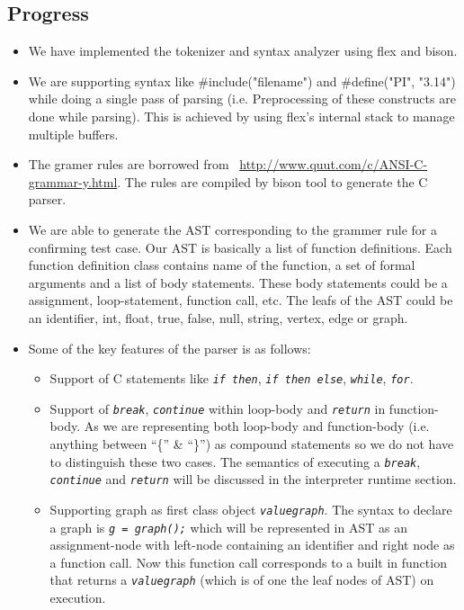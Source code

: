 \documentclass[12,twoside]{article}
\begin{document}
  \subsection{Progress}
  \begin{itemize}
    \item We have implemented the tokenizer and syntax analyzer using flex and 
    bison.  
    \item We are supporting syntax like \#include("filename") and 
    \#define("PI", "3.14") while doing a single pass of parsing  (i.e. 
        Preprocessing of these constructs are done while parsing). This is 
    achieved by using flex's internal stack to manage multiple buffers.

    \item The gramer rules are borrowed from 
    ~\url{http://www.quut.com/c/ANSI-C-grammar-y.html}. The rules are compiled 
    by bison tool to generate the C parser. 

    \item  We are able to generate the AST corresponding to the grammer rule for 
    a confirming test case. Our AST is basically a list of 
    function definitions. Each function definition class contains name of the 
    function, a set of formal arguments and a list of body statements. These 
    body statements could be a assignment, loop-statement, function call, etc.
    The leafs of the AST could be an identifier, int, float, true, false, null, 
    string, vertex, edge or graph.

    \item Some of the key features of the parser is as follows:
    \begin{itemize}
      \item Support of C statements like  {\tt\emph{if then}}, {\tt\emph{if then 
        else}}, {\tt\emph{while}}, {\tt\emph{for}}. 

      \item Support of {\tt\emph{break}}, {\tt\emph{continue}} within loop-body 
      and {\tt\emph{return}} in function-body.
      As we are representing both loop-body and function-body (i.e. anything 
          between ``\{'' \& ``\}'') as compound statements so we do not have to
      distinguish these two cases. The semantics of executing a 
{\tt\emph{break}}, {\tt\emph{continue}} and {\tt\emph{return}} will be discussed 
in the interpreter runtime section.

      \item Supporting graph as first class object {\tt\emph{valuegraph}}.
      The syntax to declare a graph is {\tt\emph{g = graph();}} which will be 
      represented in AST as an assignment-node with left-node containing an 
      identifier and right
      node as a function call. Now this function call corresponds to a built in 
      function that returns a {\tt\emph{valuegraph}} (which is of one the leaf 
          nodes of AST) on execution.


\end{itemize}
\end{itemize}
\end{document}
